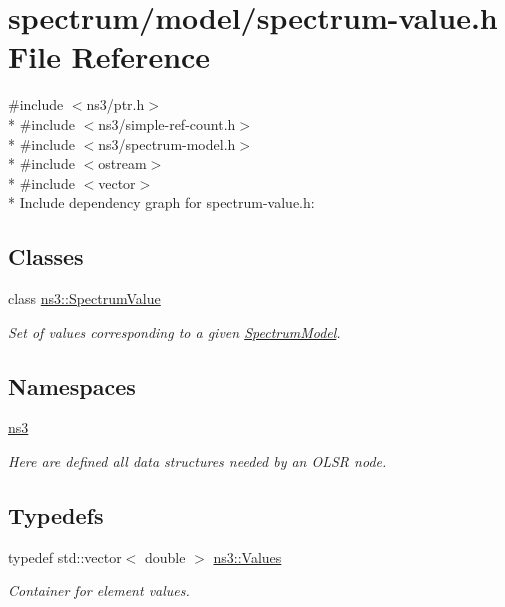 \hypertarget{spectrum-value_8h}{}\section{spectrum/model/spectrum-\/value.h File Reference}
\label{spectrum-value_8h}
{\ttfamily \#include $<$ns3/ptr.\+h$>$}\\*
{\ttfamily \#include $<$ns3/simple-\/ref-\/count.\+h$>$}\\*
{\ttfamily \#include $<$ns3/spectrum-\/model.\+h$>$}\\*
{\ttfamily \#include $<$ostream$>$}\\*
{\ttfamily \#include $<$vector$>$}\\*
Include dependency graph for spectrum-\/value.h\+:
\subsection*{Classes}
\begin{DoxyCompactItemize}
\item 
class \hyperlink{classns3_1_1SpectrumValue}{ns3\+::\+Spectrum\+Value}
\begin{DoxyCompactList}\small\item\em Set of values corresponding to a given \hyperlink{classns3_1_1SpectrumModel}{Spectrum\+Model}. \end{DoxyCompactList}\end{DoxyCompactItemize}
\subsection*{Namespaces}
\begin{DoxyCompactItemize}
\item 
 \hyperlink{namespacens3}{ns3}
\begin{DoxyCompactList}\small\item\em Here are defined all data structures needed by an O\+L\+SR node. \end{DoxyCompactList}\end{DoxyCompactItemize}
\subsection*{Typedefs}
\begin{DoxyCompactItemize}
\item 
typedef std\+::vector$<$ double $>$ \hyperlink{namespacens3_aef171a745af083fd1fb7e4a0623d7ee5}{ns3\+::\+Values}
\begin{DoxyCompactList}\small\item\em Container for element values. \end{DoxyCompactList}\end{DoxyCompactItemize}
